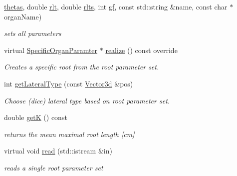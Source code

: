 \begin{DoxyCompactItemize}
\hyperlink{classCPlantBox_1_1LeafRandomOrganParameter_a4fa4931756d3ea5745548a47fd8acf9d}{thetas}, double \hyperlink{classCPlantBox_1_1LeafRandomOrganParameter_a68f4c1fd6edf01d8da75a8dc39559e51}{rlt}, double \hyperlink{classCPlantBox_1_1LeafRandomOrganParameter_a7b2de4fe287328091858d3d2d6cf63a8}{rlts}, int \hyperlink{classCPlantBox_1_1LeafRandomOrganParameter_abc948677e7e30e4a6c45f42164c2a7db}{gf}, const std\+::string \&name, const char $\ast$organ\+Name)
\begin{DoxyCompactList}\small\item\em sets all parameters \end{DoxyCompactList}\item 
virtual \hyperlink{classCPlantBox_1_1SpecificOrganParamter}{Specific\+Organ\+Paramter} $\ast$ \hyperlink{classCPlantBox_1_1LeafRandomOrganParameter_a3e6511d5398a096b39ab4dde8e7cf44f}{realize} () const override
\begin{DoxyCompactList}\small\item\em Creates a specific root from the root parameter set. \end{DoxyCompactList}\item 
int \hyperlink{classCPlantBox_1_1LeafRandomOrganParameter_a48407c07450bfabeeb7a4e1d28e51616}{get\+Lateral\+Type} (const \hyperlink{classCPlantBox_1_1Vector3d}{Vector3d} \&pos)
\begin{DoxyCompactList}\small\item\em Choose (dice) lateral type based on root parameter set. \end{DoxyCompactList}\item 
\mbox{\label{classCPlantBox_1_1LeafRandomOrganParameter_a7371ae3bc98c23a34989863ab7ac95ec}} 
double \hyperlink{classCPlantBox_1_1LeafRandomOrganParameter_a7371ae3bc98c23a34989863ab7ac95ec}{getK} () const
\begin{DoxyCompactList}\small\item\em returns the mean maximal root length \mbox{[}cm\mbox{]} \end{DoxyCompactList}\item 
\mbox{\label{classCPlantBox_1_1LeafRandomOrganParameter_a650120de4ba39a97e3a547f6f4b0b2dd}} 
virtual void \hyperlink{classCPlantBox_1_1LeafRandomOrganParameter_a650120de4ba39a97e3a547f6f4b0b2dd}{read} (std\+::istream \&in)
\begin{DoxyCompactList}\small\item\em reads a single root parameter set \end{DoxyCompactList}\item 

\end{DoxyCompactItemize}
